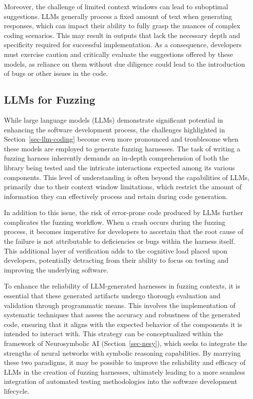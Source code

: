 \documentclass[
  a4paper,
  DIV=11,
  numbers=noendperiod]{scrreprt}
\theoremstyle{definition}
\theoremstyle{remark}
\begin{document}
Moreover, the challenge of limited context windows can lead to
suboptimal suggestions. LLMs generally process a fixed amount of text
when generating responses, which can impact their ability to fully grasp
the nuances of complex coding scenarios. This may result in outputs that
lack the necessary depth and specificity required for successful
implementation. As a consequence, developers must exercise caution and
critically evaluate the suggestions offered by these models, as reliance
on them without due diligence could lead to the introduction of bugs or
other issues in the code.

\subsection{LLMs for Fuzzing}\label{llms-for-fuzzing}

While large language models (LLMs) demonstrate significant potential in
enhancing the software development process, the challenges highlighted
in Section~\ref{sec-llm-coding} become even more pronounced and
troublesome when these models are employed to generate fuzzing
harnesses. The task of writing a fuzzing harness inherently demands an
in-depth comprehension of both the library being tested and the
intricate interactions expected among its various components. This level
of understanding is often beyond the capabilities of LLMs, primarily due
to their context window limitations, which restrict the amount of
information they can effectively process and retain during code
generation.

In addition to this issue, the risk of error-prone code produced by LLMs
further complicates the fuzzing workflow. When a crash occurs during the
fuzzing process, it becomes imperative for developers to ascertain that
the root cause of the failure is not attributable to deficiencies or
bugs within the harness itself. This additional layer of verification
adds to the cognitive load placed upon developers, potentially
detracting from their ability to focus on testing and improving the
underlying software.

To enhance the reliability of LLM-generated harnesses in fuzzing
contexts, it is essential that these generated artifacts undergo
thorough evaluation and validation through programmatic means. This
involves the implementation of systematic techniques that assess the
accuracy and robustness of the generated code, ensuring that it aligns
with the expected behavior of the components it is intended to interact
with. This strategy can be conceptualized within the framework of
Neurosymbolic AI (Section~\ref{sec-nesy}), which seeks to integrate the
strengths of neural networks with symbolic reasoning capabilities. By
marrying these two paradigms, it may be possible to improve the
reliability and efficacy of LLMs in the creation of fuzzing harnesses,
ultimately leading to a more seamless integration of automated testing
methodologies into the software development lifecycle.
\end{document}
